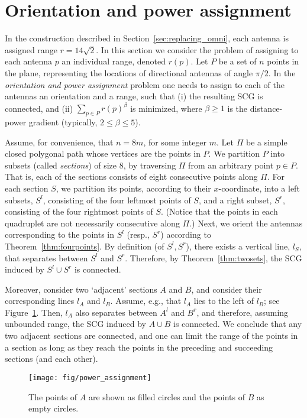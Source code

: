 \documentclass[11pt,letter]{article}
\begin{document}
\section{Orientation and power assignment}\label{sec:power_assignment}

In the construction described in Section~\ref{sec:replacing_omni}, each antenna is assigned range $r=14\sqrt{2}$.
In this section we consider the problem of assigning to each antenna $p$ an individual range, denoted $r(p)$.
Let $P$ be a set of $n$ points in the plane, representing the locations of directional antennas of angle $\pi/2$.
In the {\em orientation and power assignment} problem one needs to assign to each of the antennas an orientation and a range, such that
(i) the resulting SCG is connected, and (ii) $\sum_{p \in P}{r(p)^\beta}$ is minimized, where $\beta \ge 1$ is the distance-power gradient (typically, $2 \leq \beta \leq 5$).

Assume, for convenience, that $n = 8m$, for some integer $m$.
Let $\Pi$ be a simple closed polygonal path whose vertices are the points in $P$.
We partition $P$ into subsets (called {\em sections}) of size 8, by traversing $\Pi$ from an arbitrary point $p \in P$. That is, each of the sections consists of eight consecutive points along $\Pi$.
For each section $S$, we partition its points, according to their $x$-coordinate, into a left subsets, $S^l$, consisting of the four leftmost points of $S$, and a right subset, $S^r$, consisting of the four rightmost points of $S$.
(Notice that the points in each quadruplet are not necessarily consecutive along $\Pi$.)
Next, we orient the antennas corresponding to the points in $S^l$ (resp., $S^r$) according to Theorem~\ref{thm:fourpoints}.
By definition (of $S^l,S^r$), there exists a vertical line, $l_S$, that separates between $S^l$ and $S^r$.
Therefore, by Theorem~\ref{thm:twosets}, the SCG induced by $S^l \cup S^r$ is connected.

Moreover, consider two `adjacent' sections $A$ and $B$, and consider their corresponding lines $l_A$ and $l_B$.
Assume, e.g., that $l_A$ lies to the left of $l_B$; see Figure~\ref{fig:power_assignment}. Then, $l_A$ also separates between $A^l$ and $B^r$,
and therefore, assuming unbounded range, the SCG induced by $A \cup B$ is connected.
We conclude that any two adjacent sections are connected, and one can limit the range of the points in a section as long as they reach the points in the preceding and succeeding sections (and each other).


\begin{figure}[htp]
   \centering
       \texttt{[image: fig/power\_assignment]}
   \caption{The points of $A$ are shown as filled circles and the points of $B$ as empty circles.}
   \label{fig:power_assignment}
\end{figure}
\end{document}
